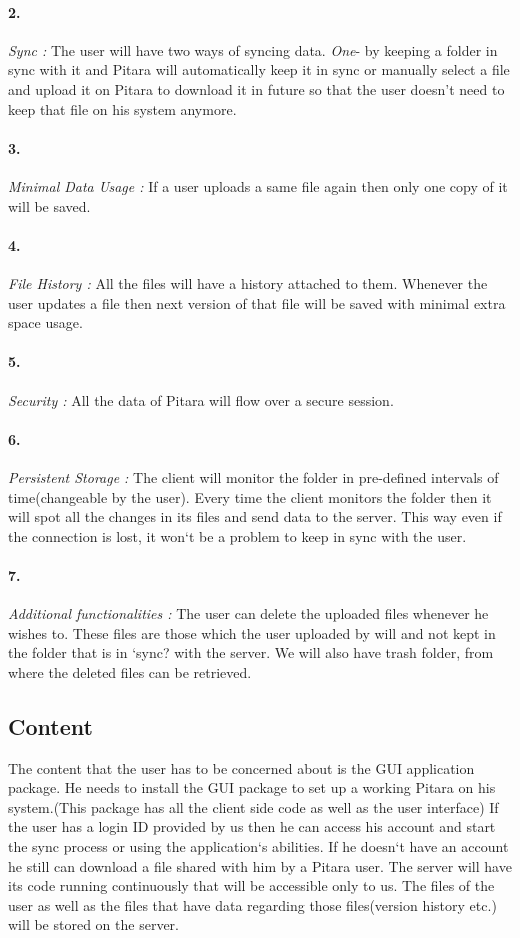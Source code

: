 \documentclass{article}
\begin{document}
\paragraph{2.} \emph{Sync :} The user will have two ways of syncing data. \emph{One}- by keeping a folder in sync with it and Pitara will automatically keep it in sync or manually select a file and upload it on Pitara to download it in future so that the user doesn't need to keep that file on his system anymore.
\paragraph{3.} \emph{Minimal Data Usage :} If a user uploads a same file again then only one copy of it will be saved.
\paragraph{4.} \emph{File History : } All the files will have a history attached to them. Whenever the user updates a file then next version of that file will be saved with minimal extra space usage.
\paragraph{5.} \emph{Security :} All the data of Pitara will flow over a secure session.
\paragraph{6.} \emph{Persistent Storage :} The client will monitor the folder in pre-defined intervals of time(changeable by the user). Every time the client monitors the folder then it will spot all the changes in its files and send data to the server. This way even if the connection is lost, it won`t be a problem to keep in sync with the user.
\paragraph{7.} \emph{Additional functionalities :} The user can delete the uploaded files whenever he wishes to. These files are those which the user uploaded by will and not kept in the folder that is in `sync? with the server. 
We will also have trash folder, from where the deleted files can be retrieved.
	\subsection{Content}
	The content that the user has to be concerned about is the GUI application package. He needs to install the GUI package to set up a working Pitara on his system.(This package has all the client side code as well as the user interface) If the user has a login ID provided by us then he can access his account and start the sync process or using the application`s abilities. If he doesn`t have an account he still can download a file shared with him by a Pitara user.
The server will have its code running continuously that will be accessible only to us. The files of the user as well as the files that have data regarding those files(version history etc.) will be stored on the server.
\end{document}

